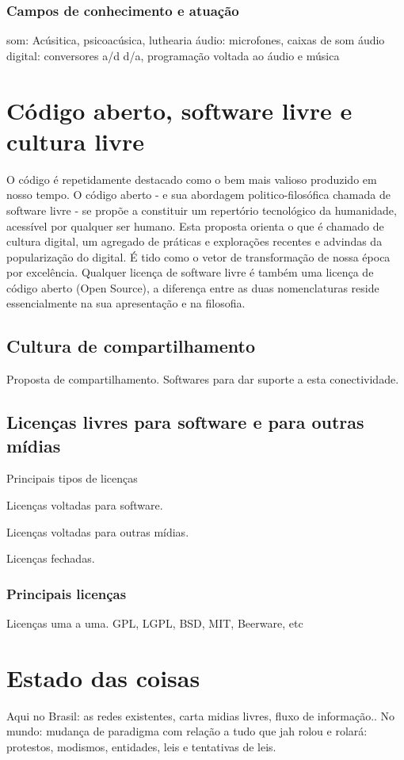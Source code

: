 	  \subsubsection{Campos de conhecimento e atuação}
	som: Acúsitica, psicoacúsica, luthearia
	áudio: microfones, caixas de som
	áudio digital: conversores a/d d/a, programação voltada ao áudio e música


  \section{Código aberto, software livre e cultura livre}
  O código é repetidamente destacado como o bem mais valioso produzido em nosso tempo.
  O código aberto - e sua abordagem politico-filosófica chamada de software livre -
  se propõe a constituir um repertório tecnológico da humanidade, acessível por
  qualquer ser humano. Esta proposta orienta o que é chamado de cultura digital,
  um agregado de práticas e explorações recentes e advindas da popularização do digital.
  É tido como o vetor de transformação de nossa época por excelência.
  Qualquer licença de software livre é também uma licença de código aberto
  (Open Source), a diferença entre as duas nomenclaturas reside essencialmente
  na sua apresentação e na filosofia.


      \subsection{Cultura de compartilhamento}
      \label{sec:soft_compar}
    Proposta de compartilhamento. Softwares para dar suporte a esta conectividade.


      \subsection{Licenças livres para software e para outras mídias}
      \label{sec:licencas_livres}
    Principais tipos de licenças

    Licenças voltadas para software.

    Licenças voltadas para outras mídias.

    Licenças fechadas.

	  \subsubsection{Principais licenças}
	  \label{sec:princ_licencas}
	Licenças uma a uma. GPL, LGPL, BSD, MIT, Beerware, etc


  \section{Estado das coisas}
  \label{sec:context}
  Aqui no Brasil: as redes existentes, carta midias livres, fluxo de informação..
  No mundo: mudança de paradigma com relação a tudo que jah rolou e rolará:
  protestos, modismos, entidades, leis e tentativas de leis.

